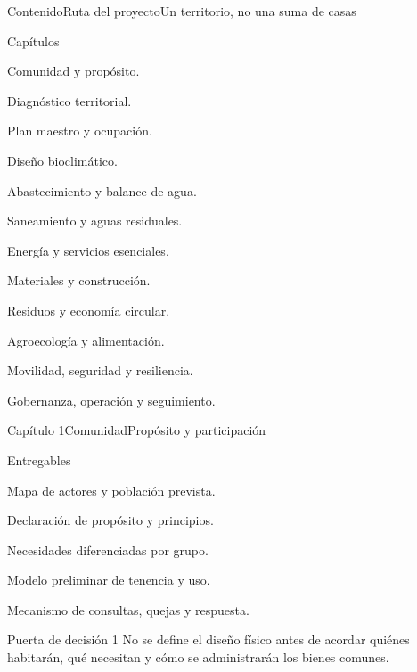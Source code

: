 \documentclass{../plantilla/hvtbook}
\begin{document}
\HVTMakeTitle

\begin{HVTPage}{Contenido}{Ruta del proyecto}{Un territorio, no una suma de casas}
\begin{HVTTaskOrdered}{Capítulos}
  \item Comunidad y propósito.
  \item Diagnóstico territorial.
  \item Plan maestro y ocupación.
  \item Diseño bioclimático.
  \item Abastecimiento y balance de agua.
  \item Saneamiento y aguas residuales.
  \item Energía y servicios esenciales.
  \item Materiales y construcción.
  \item Residuos y economía circular.
  \item Agroecología y alimentación.
  \item Movilidad, seguridad y resiliencia.
  \item Gobernanza, operación y seguimiento.
\end{HVTTaskOrdered}
\end{HVTPage}

\begin{HVTPage}{Capítulo 1}{Comunidad}{Propósito y participación}
\begin{HVTFlow}
\end{HVTFlow}
\begin{HVTTask}{Entregables}
  \item Mapa de actores y población prevista.
  \item Declaración de propósito y principios.
  \item Necesidades diferenciadas por grupo.
  \item Modelo preliminar de tenencia y uso.
  \item Mecanismo de consultas, quejas y respuesta.
\end{HVTTask}
\begin{HVTWarning}{Puerta de decisión 1}
No se define el diseño físico antes de acordar quiénes habitarán, qué necesitan y cómo se administrarán los bienes comunes.
\end{HVTWarning}
\end{HVTPage}
\end{document}
